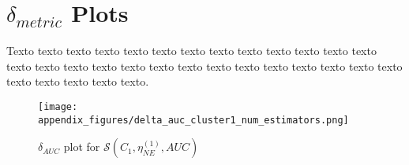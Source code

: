 \chapter{\texorpdfstring{$\delta_{metric}$}{delta} Plots}
\label{ape:delta-plots}

Texto texto texto texto texto texto texto texto texto texto texto texto texto
texto texto texto texto texto texto texto texto texto texto texto texto texto
texto texto texto texto texto texto.


\singlespacing

\renewcommand{\arraystretch}{0.85}
\captionsetup{margin=1.0cm}  %

\begin{figure}[H]
    \centering
    \texttt{[image: appendix\_figures/delta\_auc\_cluster1\_num\_estimators.png]}
    \caption{$\delta_{AUC}$ plot for $\mathcal{S}(C_1, \eta^{(1)}_{NE}, AUC)$}
\end{figure}













